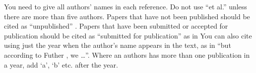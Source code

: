 \documentclass[12pt,a4paper]{article}
\begin{document}
You need to give all authors' names in each reference. Do not use ``et al.'' unless there are more than five authors.
Papers that have not been published should be cited as ``unpublished'' \cite{euther}.
Papers that have been submitted or accepted for publication should be cited as ``submitted for publication'' as in \cite{futher}
You can also cite using just the year when the author's name appears in the text, as in ``but according to Futher
\citeyear{futher},
we \dots''.  Where an authors has more than one publication in a year, add `a', `b' etc. after the year.





\end{document}
